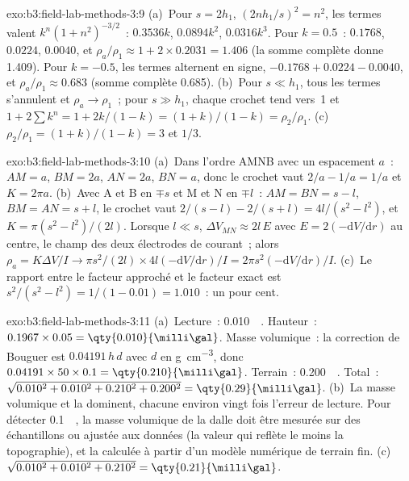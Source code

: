 \begin{solution}{exo:b3:field-lab-methods-3:9}
(a)~Pour $s = 2h_1$, $(2nh_1/s)^2 = n^2$, les termes valent $k^n(1 +
n^2)^{-3/2}$~: $0.3536k$, $0.0894k^2$, $0.0316k^3$. Pour $k = 0.5$~:
$\num{0.1768}$, $\num{0.0224}$, $\num{0.0040}$, et $\rho_a/\rho_1 \approx
1 + 2\times0.2031 = \num{1.406}$ (la somme complète donne \num{1.409}). Pour $k
= -0.5$, les termes alternent en signe, $-0.1768 + 0.0224 - 0.0040$, et
$\rho_a/\rho_1 \approx \num{0.683}$ (somme complète \num{0.685}). (b)~Pour $s \ll
h_1$, tous les termes s'annulent et $\rho_a \to \rho_1$~; pour $s \gg h_1$, chaque
crochet tend vers~1 et $1 + 2\sum k^n = 1 + 2k/(1 - k) = (1 + k)/(1 -
k) = \rho_2/\rho_1$. (c)~$\rho_2/\rho_1 = (1 + k)/(1 - k) = 3$ et $1/3$.
\end{solution}

\begin{solution}{exo:b3:field-lab-methods-3:10}
(a)~Dans l'ordre AMNB avec un espacement $a$~: $AM = a$, $BM = 2a$, $AN = 2a$,
$BN = a$, donc le crochet vaut $2/a - 1/a = 1/a$ et $K = 2\pi a$.
(b)~Avec A et B en $\mp s$ et M et N en $\mp l$~: $AM = BN = s - l$,
$BM = AN = s + l$, le crochet vaut $2/(s - l) - 2/(s + l) = 4l/(s^2 -
l^2)$, et $K = \pi(s^2 - l^2)/(2l)$. Lorsque $l \ll s$, $\Delta V_{MN}
\approx 2l\,E$ avec $E = 2(-\mathrm{d}V/\mathrm{d}r)$ au centre, le
champ des deux électrodes de courant~; alors $\rho_a = K\Delta V/I \to
\pi s^2/(2l)\times 4l(-\mathrm{d}V/\mathrm{d}r)/I = 2\pi s^2(-
\mathrm{d}V/\mathrm{d}r)/I$. (c)~Le rapport entre le facteur approché et le
facteur exact est $s^2/(s^2 - l^2) = 1/(1 - 0.01) = 1.010$~: un pour cent.
\end{solution}

\begin{solution}{exo:b3:field-lab-methods-3:11}
(a)~Lecture~: \qty{0.010}{\milli\gal}. Hauteur~:
$0.1967\times0.05 = \qty{0.010}{\milli\gal}$. Masse volumique~: la correction de Bouguer
est $0.04191\,h\,d$ avec $d$ en \unit{g.cm^{-3}}, donc
$0.04191\times50\times0.1 = \qty{0.210}{\milli\gal}$. Terrain~:
\qty{0.200}{\milli\gal}. Total~: $\sqrt{0.010^2 + 0.010^2 + 0.210^2 +
0.200^2} = \qty{0.29}{\milli\gal}$. (b)~La masse volumique et la  dominent, chacune environ vingt fois l'erreur de lecture. Pour détecter
\qty{0.1}{\milli\gal}, la masse volumique de la dalle doit être mesurée
sur des échantillons ou ajustée aux données (la valeur qui reflète le moins la
topographie), et la  calculée à partir d'un modèle numérique de terrain fin.
(c)~$\sqrt{0.010^2 + 0.010^2 + 0.210^2} = \qty{0.21}{\milli\gal}$.
\end{solution}

